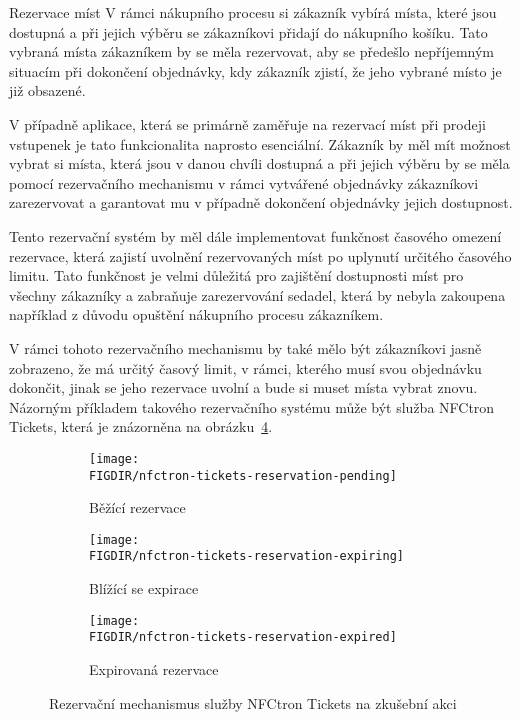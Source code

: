 \begin{subsection}{Rezervace míst}
    \label{subsec:identifikace-nakupni-kosik-rezervace}
    V rámci nákupního procesu si zákazník vybírá místa, které jsou dostupná a při jejich výběru se zákazníkovi přidají do nákupního košíku.
    Tato vybraná místa zákazníkem by se měla rezervovat, aby se předešlo nepříjemným situacím při dokončení objednávky, kdy zákazník zjistí, že jeho vybrané místo je již obsazené.

    V případně aplikace, která se primárně zaměřuje na rezervací míst při prodeji vstupenek je tato funkcionalita naprosto esenciální.
    Zákazník by měl mít možnost vybrat si místa, která jsou v danou chvíli dostupná a při jejich výběru by se měla pomocí rezervačního mechanismu v rámci vytvářené objednávky zákazníkovi zarezervovat a garantovat mu v případně dokončení objednávky jejich dostupnost.

    Tento rezervační systém by měl dále implementovat funkčnost časového omezení rezervace, která zajistí uvolnění rezervovaných míst po uplynutí určitého časového limitu.
    Tato funkčnost je velmi důležitá pro zajištění dostupnosti míst pro všechny zákazníky a zabraňuje zarezervování sedadel, která by nebyla zakoupena například z důvodu opuštění nákupního procesu zákazníkem.

    V rámci tohoto rezervačního mechanismu by také mělo být zákazníkovi jasně zobrazeno, že má určitý časový limit, v rámci, kterého musí svou objednávku dokončit, jinak se jeho rezervace uvolní a bude si muset místa vybrat znovu.
    Názorným příkladem takového rezervačního systému může být služba NFCtron Tickets, která je znázorněna na obrázku~\ref{fig:nfctron-tickets-reservation}.

    \begin{figure}[H]
        \centering
        \begin{subfigure}{0.3\textwidth}
            \texttt{[image: \\FIGDIR/nfctron-tickets-reservation-pending]}
            \caption{Běžící rezervace}
            \label{fig:nfctron-tickets-reservation-pending}
        \end{subfigure}
        \hfill
        \begin{subfigure}{0.3\textwidth}
            \texttt{[image: \\FIGDIR/nfctron-tickets-reservation-expiring]}
            \caption{Blížící se expirace}
            \label{fig:nfctron-tickets-reservation-expiring}
        \end{subfigure}
        \hfill
        \begin{subfigure}{0.3\textwidth}
            \texttt{[image: \\FIGDIR/nfctron-tickets-reservation-expired]}
            \caption{Expirovaná rezervace}
            \label{fig:nfctron-tickets-reservation-expired}
        \end{subfigure}

        \caption{Rezervační mechanismus služby NFCtron Tickets na zkušební akci\cite{nt_nfctron_simonfest}}
        \label{fig:nfctron-tickets-reservation}
    \end{figure}
\end{subsection}
